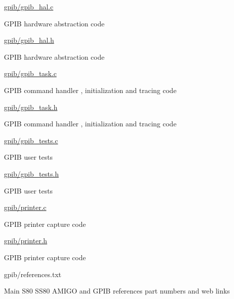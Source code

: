 \begin{DoxyItemize}
\begin{DoxyItemize}
\begin{DoxyItemize}
\end{DoxyItemize}
\item \hyperlink{gpib__hal_8c}{gpib/gpib\+\_\+hal.\+c}
\begin{DoxyItemize}
\item G\+P\+IB hardware abstraction code
\end{DoxyItemize}
\item \hyperlink{gpib__hal_8h}{gpib/gpib\+\_\+hal.\+h}
\begin{DoxyItemize}
\item G\+P\+IB hardware abstraction code
\end{DoxyItemize}
\item \hyperlink{gpib__task_8c}{gpib/gpib\+\_\+task.\+c}
\begin{DoxyItemize}
\item G\+P\+IB command handler , initialization and tracing code
\end{DoxyItemize}
\item \hyperlink{gpib__task_8h}{gpib/gpib\+\_\+task.\+h}
\begin{DoxyItemize}
\item G\+P\+IB command handler , initialization and tracing code
\end{DoxyItemize}
\item \hyperlink{gpib__tests_8c}{gpib/gpib\+\_\+tests.\+c}
\begin{DoxyItemize}
\item G\+P\+IB user tests
\end{DoxyItemize}
\item \hyperlink{gpib__tests_8h}{gpib/gpib\+\_\+tests.\+h}
\begin{DoxyItemize}
\item G\+P\+IB user tests
\end{DoxyItemize}
\item \hyperlink{printer_8c}{gpib/printer.\+c}
\begin{DoxyItemize}
\item G\+P\+IB printer capture code
\end{DoxyItemize}
\item \hyperlink{printer_8h}{gpib/printer.\+h}
\begin{DoxyItemize}
\item G\+P\+IB printer capture code
\end{DoxyItemize}
\item gpib/references.\+txt
\begin{DoxyItemize}
\item Main S80 S\+S80 A\+M\+I\+GO and G\+P\+IB references part numbers and web links

\end{DoxyItemize}
\end{DoxyItemize}
\end{DoxyItemize}
